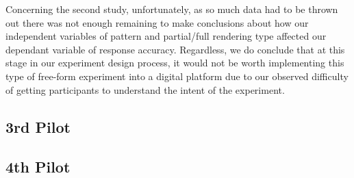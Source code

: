 Concerning the second study, unfortunately, as so much data had to be thrown out there was not enough remaining to make conclusions about how our independent variables of pattern and partial/full rendering type affected our dependant variable of response accuracy. Regardless, we do conclude that at this stage in our experiment design process, it would not be worth implementing this type of free-form experiment into a digital platform due to our observed difficulty of getting participants to understand the intent of the experiment. 

\subsection{3rd Pilot}

\subsection{4th Pilot}